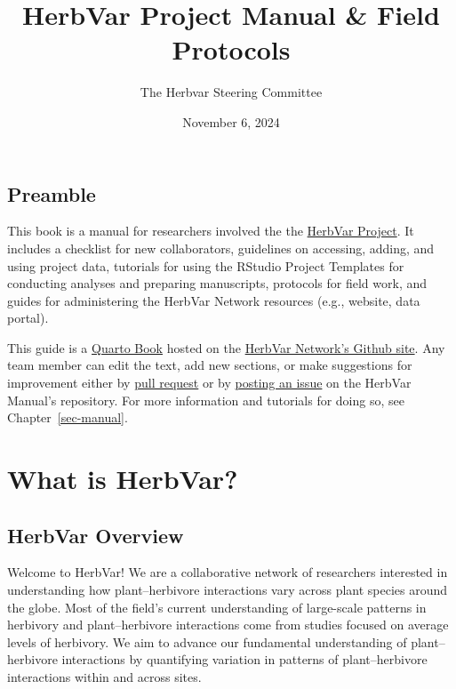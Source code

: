 \documentclass[
  letterpaper,
  oneside,
  open=any]{scrbook}
\title{HerbVar Project Manual \& Field Protocols}
\author{The Herbvar Steering Committee}
\date{November 6, 2024}
\renewcommand*\contentsname{Table of contents}
\newcommand\contentsname{Table of contents}
\begin{document}
\frontmatter
\maketitle

\renewcommand*\contentsname{Table of Contents}
{
\hypersetup{linkcolor=}
\setcounter{tocdepth}{2}
\tableofcontents
}
\listoffigures
\listoftables
\mainmatter
{}

\chapter*{Preamble}\label{preamble}


This book is a manual for researchers involved the the
\href{https://herbvar.org/}{HerbVar Project}. It includes a checklist
for new collaborators, guidelines on accessing, adding, and using
project data, tutorials for using the RStudio Project Templates for
conducting analyses and preparing manuscripts, protocols for field work,
and guides for administering the HerbVar Network resources (e.g.,
website, data portal).

This guide is a \href{https://quarto.org/docs/books}{Quarto Book} hosted
on the \href{https://github.com/HerbVar-Network}{HerbVar Network's
Github site}. Any team member can edit the text, add new sections, or
make suggestions for improvement either by
\href{https://github.com/HerbVar-Network/project_manual/pulls}{pull
request} or by
\href{https://github.com/HerbVar-Network/project_manual/issues}{posting
an issue} on the HerbVar Manual's repository. For more information and
tutorials for doing so, see Chapter~\ref{sec-manual}.

\part{What is HerbVar?}

\chapter{HerbVar Overview}\label{sec-overview}

Welcome to HerbVar! We are a collaborative network of researchers
interested in understanding how plant--herbivore interactions vary
across plant species around the globe. Most of the field's current
understanding of large-scale patterns in herbivory and plant--herbivore
interactions come from studies focused on average levels of herbivory.
We aim to advance our fundamental understanding of plant--herbivore
interactions by quantifying variation in patterns of plant--herbivore
interactions within and across sites.
\end{document}
